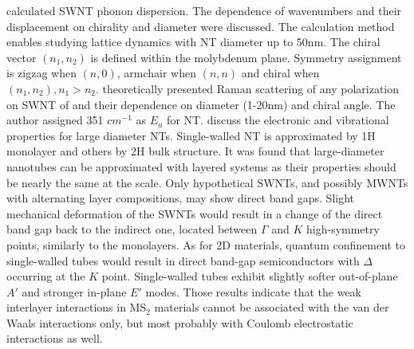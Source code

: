 \citeauthor{Dobardzic2005} calculated  SWNT phonon dispersion. The dependence of wavenumbers and their displacement on chirality and diameter were discussed. The calculation method enables studying lattice dynamics with NT diameter up to 50nm. The chiral vector $(n_1, n_2)$ is defined within the molybdenum plane. Symmetry assignment is zigzag when $(n,0)$, armchair when $(n,n)$ and chiral when $(n_1, n_2), n_1>n_2$. \citeauthor{Dobardzic2006} theoretically presented Raman scattering of any polarization on SWNT of  and their dependence on diameter (1-20nm) and chiral angle. The author assigned 351 $cm^{-1}$ as $E_u$ for  NT.\cite{Dobardzic2006} \citeauthor{Ghorbani-asl} discuss the electronic and vibrational properties for large diameter  NTs\cite{Ghorbani-asl}. Single-walled NT is approximated by 1H monolayer and others by 2H bulk structure. It was found that large-diameter nanotubes can be approximated with layered systems as their properties should be nearly the same at the scale. Only hypothetical SWNTs, and possibly MWNTs with alternating layer compositions, may show direct band gaps. Slight mechanical deformation of the SWNTs would result in a change of the direct band gap back to the indirect one, located between $\Gamma$ and $K$ high-symmetry points, similarly to the monolayers. As for 2D materials, quantum confinement to single-walled tubes would result in direct band-gap semiconductors with $\Delta$ occurring at the $K$ point. Single-walled tubes exhibit slightly softer out-of-plane $A'$ and stronger in-plane $E'$ modes. Those results indicate that the weak interlayer interactions in MS$_2$ materials cannot be associated with the van der Waals interactions only, but most probably with Coulomb electrostatic interactions as well.

